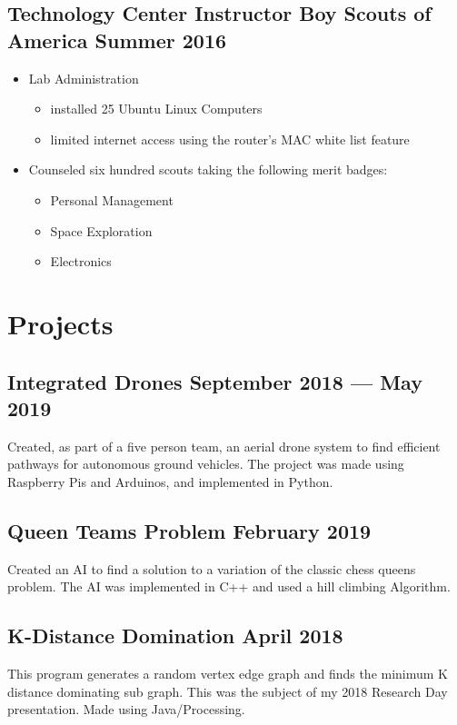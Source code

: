 \documentclass[12pt, letterpaper]{article}
\begin{document}
\subsection{Technology Center Instructor \hspace {25pt} Boy Scouts of America \hfill Summer 2016}
\begin{itemize}
	\item Lab Administration
		\begin{itemize}
			\item installed 25 Ubuntu Linux Computers
			\item limited internet access using the router's MAC white list feature
		\end{itemize}
	\item Counseled six hundred scouts taking the following merit badges:
	\begin{itemize}
		\item Personal Management
		\item Space Exploration
		\item Electronics
	\end{itemize}
\end{itemize}
\section{Projects}
\subsection{Integrated Drones \hfill September 2018 --- May 2019}
\justify
Created, as part of a five person team, an aerial drone system to find efficient pathways for autonomous ground vehicles.
The project was made using Raspberry Pis and Arduinos, and implemented in Python.

\subsection{Queen Teams Problem \hfill February 2019}
\justify
Created an AI to find a solution to a variation of the classic chess queens problem.
The AI was implemented in C++ and used a hill climbing Algorithm.

\subsection{K-Distance Domination \hfill April 2018}
\justify
This program generates a random vertex edge graph and finds the minimum K distance dominating sub graph.
This was the subject of my 2018 Research Day presentation.
Made using Java/Processing.
\end{document}
